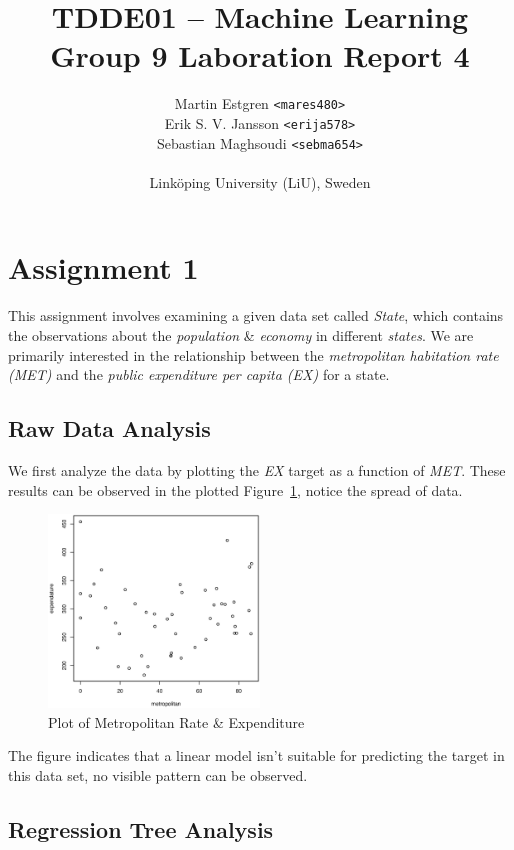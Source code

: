 \documentclass[a4paper, twocolumn]{article}
\title{TDDE01 -- Machine Learning \\
       Group 9 Laboration Report 4}
\author{{Martin Estgren \texttt{<mares480>}} \\
        {Erik S. V. Jansson \texttt{<erija578>}} \\
        {Sebastian Maghsoudi \texttt{<sebma654>}} \\~\\
        {Linköping University (LiU), Sweden}}
\begin{document}
    \maketitle %

    \section*{Assignment 1}

    This assignment involves examining a given data set called \emph{State}, which contains the observations about the \emph{population} \& \emph{economy} in different \emph{states}. We are primarily interested in the relationship between the \emph{metropolitan habitation rate (MET)} and the \emph{public expenditure per capita (EX)} for a state.

    \subsection*{Raw Data Analysis}

    We first analyze the data by plotting the \emph{EX} target as a function of \emph{MET}. These results can be observed in the plotted Figure~\ref{fig:state}, notice the spread of data.

    \begin{figure}[h!]
        \centering
        \caption{Plot of Metropolitan Rate \& Expenditure}
        \label{fig:state}
        \includegraphics[width=0.5\textwidth]{share/A1_data.eps}
    \end{figure}

    The figure indicates that a linear model isn't suitable for predicting the target in this data set, no visible pattern can be observed.

    \subsection*{Regression Tree Analysis}
\end{document}
